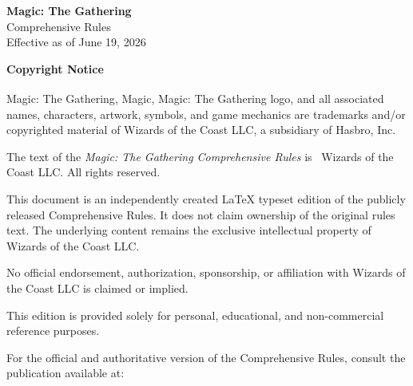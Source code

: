\documentclass[11pt,twoside,openany]{book}
\begin{document}
	
	\thispagestyle{empty}
	
	\vspace*{\fill}
	
	\begin{center}
		{\Large \textbf{Magic: The Gathering}}\\[4pt]
		{\large Comprehensive Rules}\\[6pt]
		Effective as of June 19, 2026
	\end{center}
	
	\vspace{1.5cm}
	
	\noindent
	\textbf{Copyright Notice}
	
	\vspace{0.5cm}
	
	\noindent
	Magic: The Gathering\textsuperscript{\textregistered}, Magic\textsuperscript{\textregistered}, 
	Magic: The Gathering logo, and all associated names, characters, artwork, 
	symbols, and game mechanics are trademarks and/or copyrighted material of 
	Wizards of the Coast LLC, a subsidiary of Hasbro, Inc.
	
	\vspace{0.5cm}
	
	\noindent
	The text of the \textit{Magic: The Gathering Comprehensive Rules} is 
	\textcopyright\ Wizards of the Coast LLC. All rights reserved.
	
	\vspace{0.5cm}
	
	\noindent
	This document is an independently created LaTeX typeset edition of the 
	publicly released Comprehensive Rules. It does not claim ownership of the 
	original rules text. The underlying content remains the exclusive intellectual 
	property of Wizards of the Coast LLC.
	
	\vspace{0.5cm}
	
	\noindent
	No official endorsement, authorization, sponsorship, or affiliation with 
	Wizards of the Coast LLC is claimed or implied.
	
	\vspace{0.5cm}
	
	\noindent
	This edition is provided solely for personal, educational, and 
	non-commercial reference purposes.
	
	\vspace{0.5cm}
	
	\noindent
	For the official and authoritative version of the Comprehensive Rules, 
	consult the publication available at:
	
\end{document}
